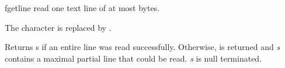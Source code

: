 \begin{DoxyDocu}{fgetline}
\label{numberline_8c_a8b39e07a1bd3338f27e7dacabeafde15_a8b39e07a1bd3338f27e7dacabeafde15}
read one text line of at most  bytes.

The  character is replaced by {}.

\begin{DoxyReturn}{Returns}
s if an entire line was read successfully. Otherwise,  is returned and {\itshape s} contains a maximal partial line that could be read. {\itshape s} is null terminated.
\end{DoxyReturn}


\end{DoxyDocu}
